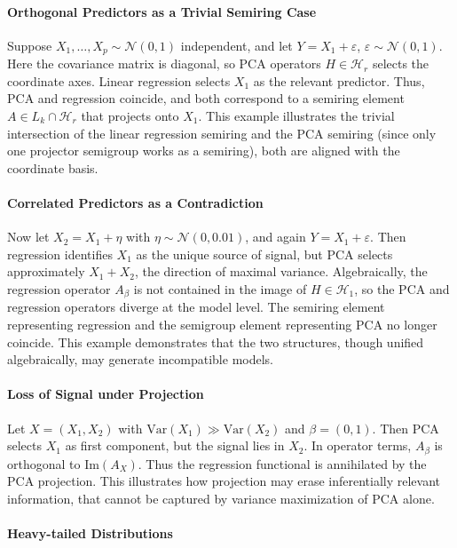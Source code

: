 \paragraph{Orthogonal Predictors as a Trivial Semiring Case}

Suppose $X_1, \dots, X_p \sim \mathcal{N}(0,1)$ independent, and let $Y = X_1 + \varepsilon$, $\varepsilon \sim \mathcal{N}(0,1)$. Here the covariance matrix is diagonal, so PCA operators $H \in \mathcal{H}_r$ selects the coordinate axes. Linear regression selects $X_1$ as the relevant predictor. Thus, PCA and regression coincide, and both correspond to a semiring element $A \in L_k \cap \mathcal{H}_r$ that projects onto $X_1$. This example illustrates the trivial intersection of the linear regression semiring and the PCA semiring (since only one projector semigroup works as a semiring), both are aligned with the coordinate basis.

\paragraph{Correlated Predictors as a Contradiction}

Now let $X_2 = X_1 + \eta$ with $\eta \sim \mathcal{N}(0,0.01)$, and again $Y = X_1 + \varepsilon$. Then regression identifies $X_1$ as the unique source of signal, but PCA selects approximately $X_1 + X_2$, the direction of maximal variance. Algebraically, the regression operator $A_\beta$ is not contained in the image of $H \in \mathcal{H}_1$, so the PCA and regression operators diverge at the model level. The semiring element representing regression and the semigroup element representing PCA no longer coincide. This example demonstrates that the two structures, though unified algebraically, may generate incompatible models.

\paragraph{Loss of Signal under Projection}

Let $X = (X_1,X_2)$ with $\mathrm{Var}(X_1)\gg \mathrm{Var}(X_2)$ and $\beta=(0,1)$. Then PCA selects $X_1$ as first component, but the signal lies in $X_2$. In operator terms, $A_\beta$ is orthogonal to $\mathrm{Im}(A_X)$. Thus the regression functional is annihilated by the PCA projection. This illustrates how projection may erase inferentially relevant information, that cannot be captured by variance maximization of PCA alone.

\paragraph{Heavy-tailed Distributions}

